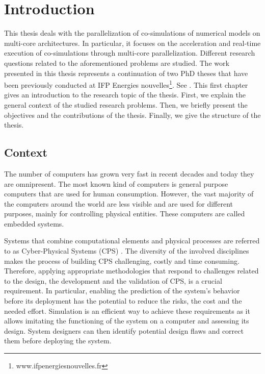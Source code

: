 
\chapter{\label{ch:1-intro}Introduction} 

\minitoc

This thesis deals with the parallelization of co-simulations of numerical models on multi-core architectures. In particular, it focuses on the acceleration and real-time execution of co-simulations through multi-core parallelization. Different research questions related to the aforementioned problems are studied. The work presented in this thesis represents a continuation of two PhD theses that have been previously conducted at IFP Energies nouvelles\footnote{www.ifpenergiesnouvelles.fr}. See \cite{faure:2011,benkhaled:2014_thesis}. This first chapter gives an introduction to the research topic of the thesis. First, we explain the general context of the studied research problems. Then, we briefly present the objectives and the contributions of the thesis. Finally, we give the structure of the thesis. 

\section{Context}

The number of computers has grown very fast in recent decades and today they are omnipresent. The most known kind of computers is general purpose computers that are used for human consumption. However, the vast majority of the computers around the world are less visible and are used for different purposes, mainly for controlling physical entities. These computers are called embedded systems. 

Systems that combine computational elements and physical processes are referred to as Cyber-Physical Systems (CPS) \cite{lee:2016}. The diversity of the involved disciplines makes the process of building CPS challenging, costly and time consuming. Therefore, applying appropriate methodologies that respond to challenges related to the design, the development and the validation of CPS, is a crucial requirement. In particular, enabling the prediction of the system's behavior before its deployment has the potential to reduce the risks, the cost and the needed effort. Simulation is an efficient way to achieve these requirements as it allows imitating the functioning of the system on a computer and assessing its design. System designers can then identify potential design flaws and correct them before deploying the system.

